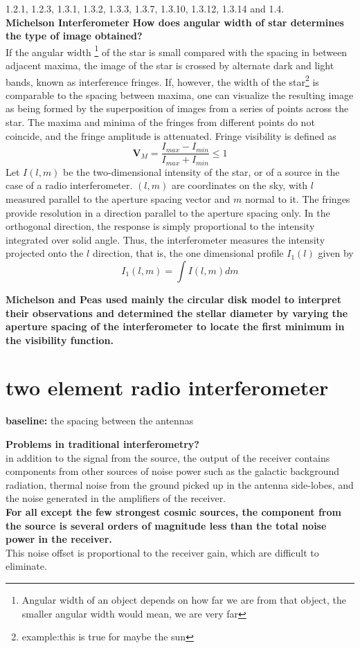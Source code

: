 \documentclass[10pt]{report}
\newcommand{\mbf}[1]{\mathbf{#1}}
\newcommand{\fn}[1]{\footnote{#1}}
\newcommand{\cbox}{tcolorbox}
\begin{document}
1.2.1, 1.2.3, 1.3.1, 1.3.2, 1.3.3,
1.3.7, 1.3.10, 1.3.12, 1.3.14 and 1.4.\\
\textbf{Michelson Interferometer}
\textbf{How does angular width of star determines the type of image obtained?}\\
 If the angular width \fn{Angular width of an object depends on how far we are from that object, the smaller angular width would mean, we are very far} of the star is small compared with the spacing in
between adjacent maxima, the image of the star is crossed by alternate dark and light bands, known as interference fringes. If, however, the width of the star\fn{example:this is true for maybe the sun} is comparable to the spacing between maxima, one can visualize the resulting image as being formed by the superposition of images from a series of points across the star. The maxima and minima of the fringes from different points do not coincide, and the fringe amplitude is attenuated. Fringe visibility is defined as 
\begin{equation}
\mbf{V}_M=\frac{I_{max}-I_{min}}{I_{max}+I_{min}} \leq 1
\end{equation}
Let $I(l,m)$ be the two-dimensional intensity of the star, or of a source in the case of a radio interferometer. $(l,m)$ are coordinates on the sky, with $l$ measured parallel to the aperture spacing vector and $m$ normal to it. The fringes provide resolution in a direction parallel to the aperture spacing only. In the orthogonal direction, the response is simply proportional to the intensity integrated over solid angle. Thus, the interferometer measures the intensity projected onto the $l$ direction, that is, the one dimensional profile $I_1(l)$ given by 
\begin{equation}
I_1(l,m)=\int I(l,m) dm
\end{equation}
 
\textbf{Michelson and Peas used mainly the circular disk model to interpret their observations and determined the stellar diameter by varying the aperture spacing of the interferometer to locate the first minimum in the visibility function.}

\section{two element radio interferometer}
\textbf{baseline:} the spacing between the antennas

\begin{\cbox}
\textbf{Problems in traditional interferometry?}\\
in addition to the signal from the source, the output of the receiver contains components from other sources of noise power such as the galactic background radiation, thermal noise from the ground picked up in the antenna side-lobes, and the noise generated in the amplifiers  of the receiver.\\
\textbf{For all except the few strongest cosmic sources, the component from the source is several orders of magnitude less than the total noise power in the receiver.}
\\
This noise offset is proportional to the receiver gain, which are difficult to eliminate.
\end{\cbox}
\end{document}
